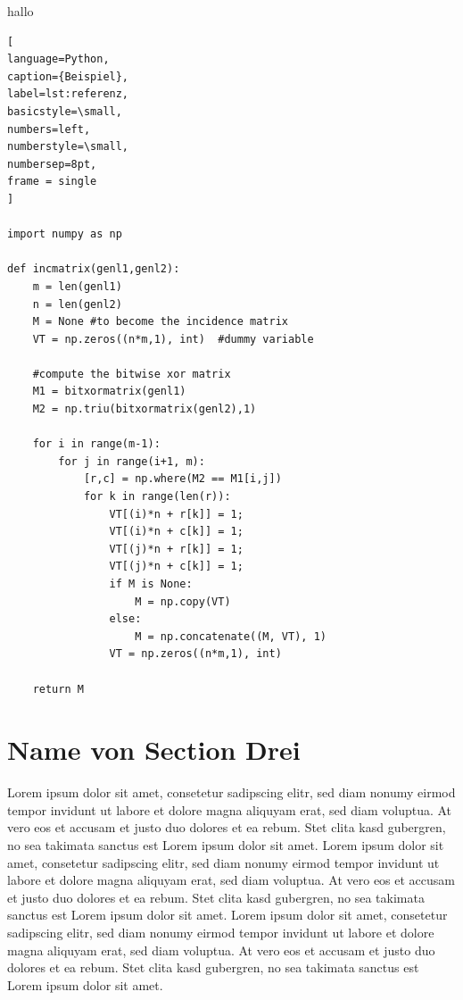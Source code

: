 \documentclass{article}
\begin{document}
hallo
\begin{lstlisting}[
language=Python,
caption={Beispiel}, 
label=lst:referenz,
basicstyle=\small, 
numbers=left, 
numberstyle=\small, 
numbersep=8pt, 
frame = single 
]

import numpy as np
 
def incmatrix(genl1,genl2):
    m = len(genl1)
    n = len(genl2)
    M = None #to become the incidence matrix
    VT = np.zeros((n*m,1), int)  #dummy variable
 
    #compute the bitwise xor matrix
    M1 = bitxormatrix(genl1)
    M2 = np.triu(bitxormatrix(genl2),1) 
 
    for i in range(m-1):
        for j in range(i+1, m):
            [r,c] = np.where(M2 == M1[i,j])
            for k in range(len(r)):
                VT[(i)*n + r[k]] = 1;
                VT[(i)*n + c[k]] = 1;
                VT[(j)*n + r[k]] = 1;
                VT[(j)*n + c[k]] = 1;
                if M is None:
                    M = np.copy(VT)
                else:
                    M = np.concatenate((M, VT), 1)
                VT = np.zeros((n*m,1), int)
 
    return M
\end{lstlisting}


\section{Name von Section Drei}
\label{sec:section_3}

Lorem ipsum dolor sit amet, consetetur sadipscing elitr, sed diam nonumy eirmod tempor invidunt ut labore et dolore magna aliquyam erat, sed diam voluptua. At vero eos et accusam et justo duo dolores et ea rebum. Stet clita kasd gubergren, no sea takimata sanctus est Lorem ipsum dolor sit amet. Lorem ipsum dolor sit amet, consetetur sadipscing elitr, sed diam nonumy eirmod tempor invidunt ut labore et dolore magna aliquyam erat, sed diam voluptua. At vero eos et accusam et justo duo dolores et ea rebum. Stet clita kasd gubergren, no sea takimata sanctus est Lorem ipsum dolor sit amet. Lorem ipsum dolor sit amet, consetetur sadipscing elitr, sed diam nonumy eirmod tempor invidunt ut labore et dolore magna aliquyam erat, sed diam voluptua. At vero eos et accusam et justo duo dolores et ea rebum. Stet clita kasd gubergren, no sea takimata sanctus est Lorem ipsum dolor sit amet.   
\end{document}
